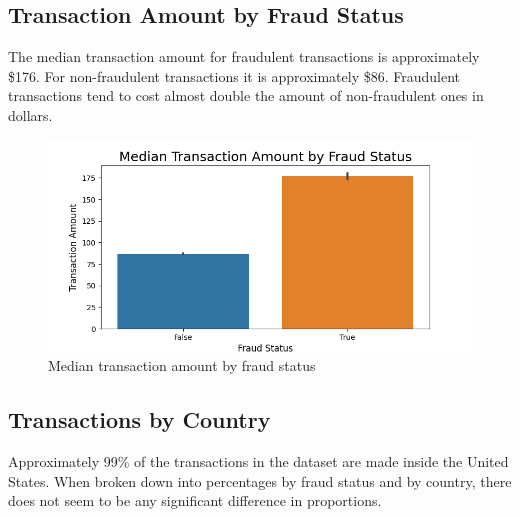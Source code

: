 \documentclass[12pt]{article}
\begin{document}
\newpage
\subsection{Transaction Amount by Fraud Status}
The median transaction amount for fraudulent transactions is approximately \$176. For non-fraudulent transactions it is approximately \$86. Fraudulent transactions tend to cost almost double the amount of non-fraudulent ones in dollars.
\begin{figure}[h]
    \centering
    \includegraphics[width=\textwidth]{images/trans_amount_by_fraud.png}
    \caption{Median transaction amount by fraud status}
    \label{fig:my_label}
\end{figure}

\newpage
\subsection{Transactions by Country}
Approximately 99\% of the transactions in the dataset are made inside the United States. When broken down into percentages by fraud status and by country, there does not seem to be any significant difference in proportions.
\end{document}
